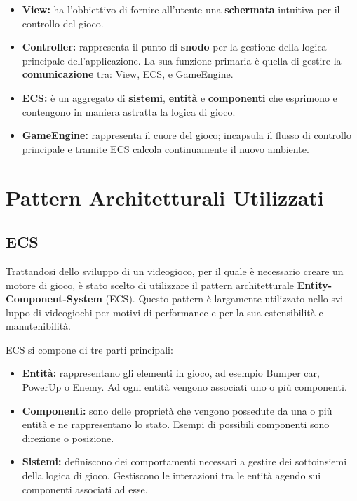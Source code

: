 \begin{itemize}
    \item \textbf{View:} ha l'obbiettivo di fornire all'utente una \textbf{schermata} intuitiva per il controllo del gioco.
    \item \textbf{Controller:} rappresenta il punto di \textbf{snodo} per la gestione della logica principale dell'applicazione. La sua funzione primaria è quella di gestire la \textbf{comunicazione} tra: View, ECS, e GameEngine.
    \item \textbf{ECS:} è un aggregato di \textbf{sistemi}, \textbf{entità} e \textbf{componenti} che esprimono e contengono in maniera astratta la logica di gioco.
    \item \textbf{GameEngine:} rappresenta il cuore del gioco; incapsula il flusso di controllo principale e tramite ECS calcola continuamente il nuovo ambiente.
\end{itemize}

\section{Pattern Architetturali Utilizzati}
\subsection{ECS}
Trattandosi dello sviluppo di un videogioco, per il quale è necessario creare un motore di gioco, è stato scelto di utilizzare il pattern architetturale \textbf{Entity-Component-System} (ECS). Questo pattern è largamente utilizzato nello svi-luppo di videogiochi per motivi di performance e per la sua estensibilità e manutenibilità.

ECS si compone di tre parti principali:
\begin{itemize}
    \item \textbf{Entità:} rappresentano gli elementi in gioco, ad esempio Bumper car, PowerUp o Enemy. Ad ogni entità vengono associati uno o più componenti.
    \item \textbf{Componenti:} sono delle proprietà che vengono possedute da una o più entità e ne rappresentano lo stato. Esempi di possibili componenti sono direzione o posizione. 
    \item \textbf{Sistemi:} definiscono dei comportamenti necessari a gestire dei sottoinsiemi della logica di gioco. Gestiscono le interazioni tra le entità agendo sui componenti associati ad esse.
\end{itemize}


